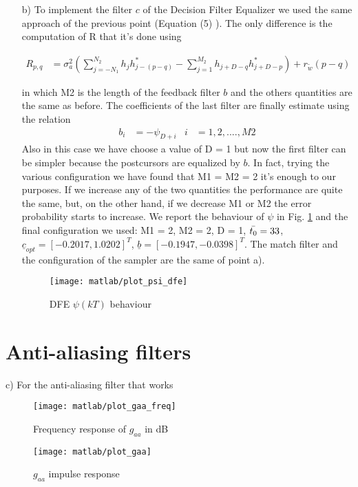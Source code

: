 \documentclass[a4paper,oneside]{article}
\renewcommand{\vec}[1]{\underline{#1}}
\begin{document}
\begin{itemize}
\item[b)] To implement the filter $c$ of the Decision Filter Equalizer we used the same approach of the previous point (Equation (5) ). The only difference is the computation of R that it's done using

\begin{align}
 R_{p,q} &= \sigma^2_a\left( \sum_{j=-N_1}^{N_2}h_jh^*_{j-(p-q)} - \sum_{j=1}^{M_2}h_{j+D-q}h^*_{j+D-p} \right) + r_{\tilde{w}}(p-q)
\end{align}

in which M2 is the length of the feedback filter $b$ and the others quantities are the same as before.
The coefficients of the last filter are finally estimate using the relation 
\begin{align}
b_i &= - \psi_{D+i}&  i &= 1,2,....,M2
\end{align}
Also in this case we have choose a value of D = 1 but now the first filter can be simpler because the postcursors are equalized by $b$. In fact, trying the various configuration we have found that M1 = M2 = 2 it's enough to our purposes. If we increase any of the two quantities the performance are quite the same, but, on the other hand, if we decrease M1 or M2 the error probability starts to increase. We report the behaviour of $\psi$ in Fig. \ref{plot:psi_dfe_1} and the final configuration we used:
M1 = 2, M2 = 2, D = 1, $\Bar{t_0} = 33$, $\vec{c}_{opt} = [-0.2017, 1.0202]^T$, $\vec{b} = [-0.1947, -0.0398]^T$. The match filter and the configuration of the sampler are the same of point a).

\begin{figure}[h]
  \centering
  \texttt{[image: matlab/plot\_psi\_dfe]}
  \caption{DFE $\psi(kT)$ behaviour}
  \label{plot:psi_dfe_1}
\end{figure}


\end{itemize}




\section{Anti-aliasing filters}
c) For the anti-aliasing filter that works 
\begin{figure}[h]
  \centering
  \texttt{[image: matlab/plot\_gaa\_freq]}
  \caption{Frequency response of $g_{aa}$ in dB}
  \label{plot:Gaa2}
\end{figure}
\begin{figure}[]
  \centering
  \texttt{[image: matlab/plot\_gaa]}
  \caption{$g_{aa}$ impulse response}
  \label{plot:gaa2}
\end{figure}
\end{document}
